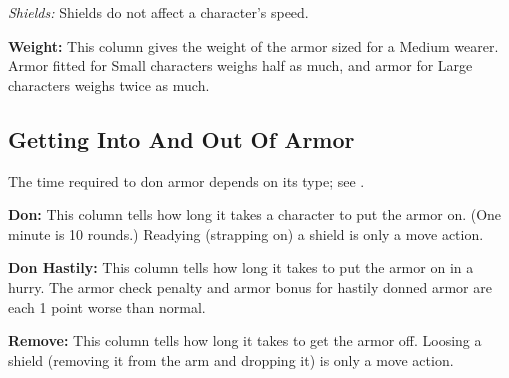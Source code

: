 \textit{Shields:} Shields do not affect a character's speed.

\textbf{Weight:} This column gives the weight of the armor sized for a Medium wearer. Armor fitted for Small characters weighs half as much, and armor for Large characters weighs twice as much.

\subsection{Getting Into And Out Of Armor}
The time required to don armor depends on its type; see .

\textbf{Don:} This column tells how long it takes a character to put the armor on. (One minute is 10 rounds.) Readying (strapping on) a shield is only a move action.

\textbf{Don Hastily:} This column tells how long it takes to put the armor on in a hurry. The armor check penalty and armor bonus for hastily donned armor are each 1 point worse than normal.

\textbf{Remove:} This column tells how long it takes to get the armor off. Loosing a shield (removing it from the arm and dropping it) is only a move action.

